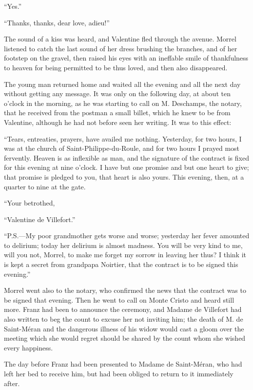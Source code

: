 “Yes.”

“Thanks, thanks, dear love, adieu!”

The sound of a kiss was heard, and Valentine fled through the avenue.
Morrel listened to catch the last sound of her dress brushing the
branches, and of her footstep on the gravel, then raised his eyes with
an ineffable smile of thankfulness to heaven for being permitted to be
thus loved, and then also disappeared.

The young man returned home and waited all the evening and all the next
day without getting any message. It was only on the following day, at
about ten o’clock in the morning, as he was starting to call on M.
Deschamps, the notary, that he received from the postman a small
billet, which he knew to be from Valentine, although he had not before
seen her writing. It was to this effect:

“Tears, entreaties, prayers, have availed me nothing. Yesterday, for
two hours, I was at the church of Saint-Philippe-du-Roule, and for two
hours I prayed most fervently. Heaven is as inflexible as man, and the
signature of the contract is fixed for this evening at nine o’clock. I
have but one promise and but one heart to give; that promise is pledged
to you, that heart is also yours. This evening, then, at a quarter to
nine at the gate.

“Your betrothed,

“Valentine de Villefort.”

“P.S.—My poor grandmother gets worse and worse; yesterday her fever
amounted to delirium; today her delirium is almost madness. You will be
very kind to me, will you not, Morrel, to make me forget my sorrow in
leaving her thus? I think it is kept a secret from grandpapa Noirtier,
that the contract is to be signed this evening.”

Morrel went also to the notary, who confirmed the news that the
contract was to be signed that evening. Then he went to call on Monte
Cristo and heard still more. Franz had been to announce the ceremony,
and Madame de Villefort had also written to beg the count to excuse her
not inviting him; the death of M. de Saint-Méran and the dangerous
illness of his widow would cast a gloom over the meeting which she
would regret should be shared by the count whom she wished every
happiness.

The day before Franz had been presented to Madame de Saint-Méran, who
had left her bed to receive him, but had been obliged to return to it
immediately after.

